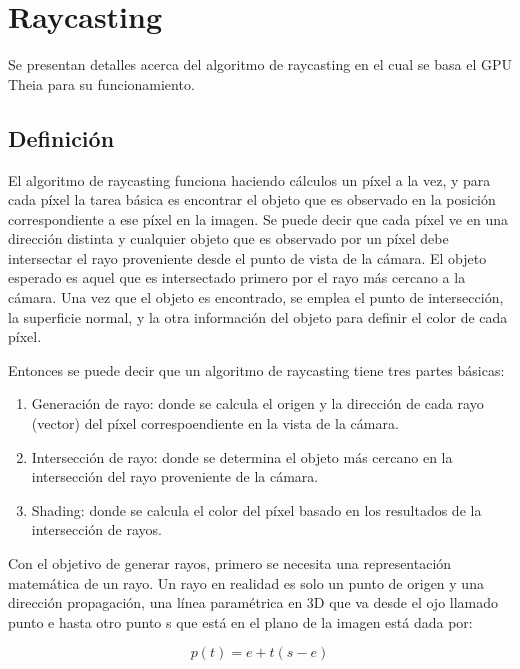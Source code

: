 \section{Raycasting}

Se presentan detalles acerca del algoritmo de raycasting en el cual se basa el GPU Theia para su funcionamiento.

\subsection{Definición}

El algoritmo de raycasting funciona haciendo cálculos un píxel a la vez, y para cada píxel la tarea básica es encontrar el objeto que es observado en la posición correspondiente a ese píxel en la imagen. Se puede decir que cada píxel ve en una dirección distinta y cualquier objeto que es observado por un píxel debe intersectar el rayo proveniente desde el punto de vista de la cámara. El objeto esperado es aquel que es intersectado primero por el rayo más cercano a la cámara. Una vez que el objeto es encontrado, se emplea el punto de intersección, la superficie normal, y la otra información del objeto para definir el color de cada píxel. 

Entonces se puede decir que un algoritmo de raycasting tiene tres partes básicas:

\begin{enumerate}

\item Generación de rayo: donde se calcula el origen y la dirección de cada rayo (vector) del píxel correspoendiente en la vista de la cámara.
\item Intersección de rayo: donde se determina el objeto más cercano en la intersección del rayo proveniente de la cámara.
\item Shading: donde se calcula el color del píxel basado en los resultados de la intersección de rayos.

\end{enumerate}

Con el objetivo de generar rayos, primero se necesita una representación matemática de un rayo. Un rayo en realidad es solo un punto de origen y una dirección propagación, una línea paramétrica en 3D que va desde el ojo llamado punto e hasta otro punto s que está en el plano de la imagen está dada por: 

\begin{equation}
\label{eq:ray_definition}
  p(t) = e+t(s-e)
\end{equation}

